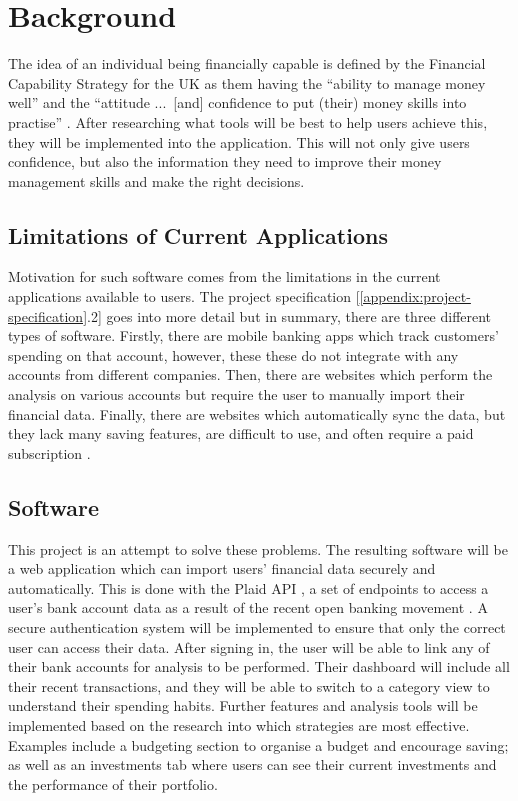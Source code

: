 \section{Background}
\label{sec:background}

The idea of an individual being financially capable is defined by the Financial Capability Strategy for the UK as them having the ``ability to manage money well'' and the ``attitude ...\ [and] confidence to put (their) money skills into practise'' \cite{FinancialCapabilityUK}. After researching what tools will be best to help users achieve this, they will be implemented into the application. This will not only give users confidence, but also the information they need to improve their money management skills and make the right decisions.


\subsection{Limitations of Current Applications}
Motivation for such software comes from the limitations in the current applications available to users. The project specification [\ref{appendix:project-specification}.2] goes into more detail but in summary, there are three different types of software. Firstly, there are mobile banking apps which track customers' spending on that account, however, these these do not integrate with any accounts from different companies. Then, there are websites which perform the analysis on various accounts but require the user to manually import their financial data. Finally, there are websites which automatically sync the data, but they lack many saving features, are difficult to use, and often require a paid subscription \cite{PersonalFinanceAppsComparison}.

\subsection{Software}
This project is an attempt to solve these problems. The resulting software will be a web application which can import users' financial data securely and automatically. This is done with the Plaid API \cite{Plaid}, a set of endpoints to access a user's bank account data as a result of the recent open banking movement \cite{OpenBanking}. A secure authentication system will be implemented to ensure that only the correct user can access their data. After signing in, the user will be able to link any of their bank accounts for analysis to be performed. Their dashboard will include all their recent transactions, and they will be able to switch to a category view to understand their spending habits. Further features and analysis tools will be implemented based on the research into which strategies are most effective. Examples include a budgeting section to organise a budget and encourage saving; as well as an investments tab where users can see their current investments and the performance of their portfolio.

